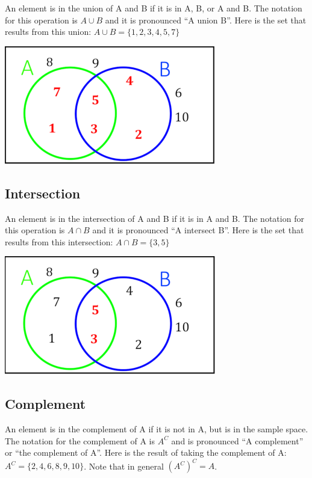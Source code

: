 \documentclass[
]{book}
\theoremstyle{definition}
\theoremstyle{definition}
\theoremstyle{definition}
\theoremstyle{remark}
\begin{document}
An element is in the union of A and B if it is in A, B, or A and B. The notation for this operation is \(A \cup B\) and it is pronounced ``A union B''. Here is the set that results from this union: \(A \cup B = \{1,2,3,4,5,7\}\)

\includegraphics{Pictures/01-Sets/AUB.PNG}

\hypertarget{intersection}{%
\subsection{Intersection}\label{intersection}}

An element is in the intersection of A and B if it is in A and B. The notation for this operation is \(A \cap B\) and it is pronounced ``A intersect B''. Here is the set that results from this intersection: \(A \cap B = \{3,5\}\)

\includegraphics{Pictures/01-Sets/AcapB.PNG}

\hypertarget{complement}{%
\subsection{Complement}\label{complement}}

An element is in the complement of A if it is not in A, but is in the sample space. The notation for the complement of A is \(A^C\) and is pronounced ``A complement'' or ``the complement of A''. Here is the result of taking the complement of A: \(A^C = \{2,4,6,8,9,10\}\). Note that in general \((A^C)^C = A\).
\end{document}
